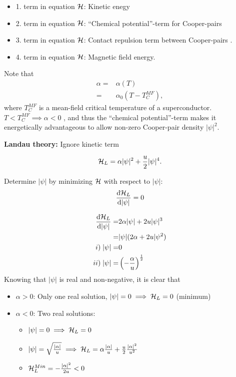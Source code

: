\begin{itemize}
\item 1. term in equation $\mathcal{H}$: Kinetic enegy
\item 2. term in equation $\mathcal{H}$: ``Chemical potential''-term for Cooper-pairs
\item 3. term in equation $\mathcal{H}$: Contact repulsion term between Cooper-pairs .
\item 4. term in equation $\mathcal{H}$: Magnetic field energy.
\end{itemize}
Note that
\begin{equation}
\begin{aligned}
\alpha =& \alpha(T) \\
=& \alpha_0 (T - T_C^{MF}), 
\label{alpha}
\end{aligned}
\end{equation}
where $T_C^{MF}$ is a mean-field critical temperature of a superconductor. $T < T_C^{MF} \implies \alpha<0$ , and thus the ``chemical potential''-term makes it energetically advantageous to allow non-zero Cooper-pair density $|\psi|^2$.

\textbf{Landau theory:} Ignore kinetic term 

\begin{equation}
\mathcal{H}_L = \alpha |\psi|^2 + \frac{u}{2} |\psi|^4.
\label{H_L}
\end{equation}

Determine $|\psi|$ by minimizing $\mathcal{H}$ with respect to $|\psi|$:
\begin{equation}
\frac{\dd{\mathcal{H}_L}}{\dd|\psi|} = 0
\end{equation}

\begin{equation}
\begin{aligned}
\frac{\dd{\mathcal{H}_L}}{\dd|\psi|}  =&  2\alpha |\psi| + 2u|\psi|^3 \\
=& |\psi| (2\alpha + 2u |\psi^2) \\
i)\;|\psi|  =& 0 \\
ii)\; |\psi|  =& \left ( - \frac{\alpha}{u}\right )^\frac{1}{2}  
\label{alpha}
\end{aligned}
\end{equation}
Knowing that $|\psi| $ is real and non-negative, it is clear that

\begin{itemize}
\item $\alpha>0$: Only one real solution, $|\psi| = 0 \implies \mathcal{H}_L = 0$ (minimum)
\item  $\alpha<0$: Two real solutions: 
\begin{itemize}
\item$|\psi| = 0 \implies \mathcal{H}_L = 0$ \
\item$|\psi| = \sqrt{\frac{|\alpha|}{u}} \implies \mathcal{H}_L = \alpha \frac{|\alpha|}{u} + \frac{u}{2} \frac{|\alpha|^2}{u^2}$
\item $\mathcal{H}^{Min}_L = - \frac{|\alpha|^2}{2u} < 0$
\end{itemize}
\end{itemize}

